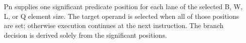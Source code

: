 Pn supplies one significant predicate position for each lane of the selected
B, W, L, or Q element size.  The target operand is selected when all of those
positions are set; otherwise execution continues at the next instruction.  The
branch decision is derived solely from the significant positions.
